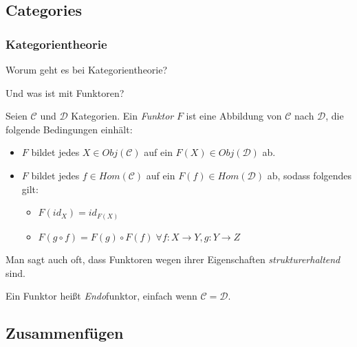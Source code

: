 \documentclass{beamer}
\begin{document}
\subsection*{Categories}

\begin{frame}
\frametitle{Kategorientheorie}

Worum geht es bei Kategorientheorie?
\end{frame}


\begin{frame}
Und was ist mit Funktoren?\pause\bigskip

Seien $\mathcal{C}$ und $\mathcal{D}$ Kategorien. Ein \emph{Funktor} $F$ ist eine Abbildung
von $\mathcal{C}$ nach $\mathcal{D}$, die folgende Bedingungen einhält:

\begin{itemize}
\pause \item $F$ bildet jedes $X \in Obj(\mathcal{C})$ auf ein $F(X) \in Obj(\mathcal{D})$ ab.
\pause \item $F$ bildet jedes $f \in Hom(\mathcal{C})$ auf ein $F(f) \in Hom(\mathcal{D})$ ab, sodass folgendes gilt:
\begin{itemize}
\pause \item $F(id_X) = id_{F(X)}$
\pause \item $F(g \circ f) = F(g) \circ F(f) \; \forall f: X \to Y, g : Y \to Z$
\end{itemize}
\end{itemize}
\pause\bigskip

Man sagt auch oft, dass Funktoren wegen ihrer Eigenschaften \emph{strukturerhaltend} sind.\pause\smallskip\smallskip

Ein Funktor heißt \emph{Endo}funktor, einfach wenn $\mathcal{C} = \mathcal{D}$.

\end{frame}

\subsection*{Zusammenfügen}
\end{document}
